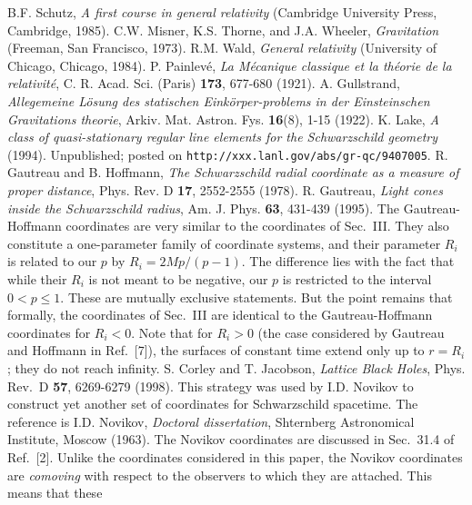 \begin{references}
   B.F. Schutz, {\it A first course in general
   relativity} (Cambridge University Press, Cambridge, 1985). 
   C.W. Misner, K.S. Thorne, and J.A. Wheeler, 
   {\it Gravitation} 
   (Freeman, San Francisco, 1973).
   R.M. Wald, {\it General relativity} 
   (University of Chicago, Chicago, 1984).  
   P. Painlev\'e, {\it La M\'ecanique classique et la th\'eorie de la 
   relativit\'e}, C. R. Acad. Sci. (Paris) {\bf 173}, 677-680 (1921). 
   A. Gullstrand, {\it Allegemeine L\"osung des statischen
   Eink\"orper-problems in der Einsteinschen Gravitations theorie}, 
   Arkiv. Mat. Astron. Fys. {\bf 16}(8), 1-15 (1922). 
   K. Lake, {\it A class of quasi-stationary regular line elements for
   the Schwarzschild geometry} (1994). Unpublished; posted on  
   {\tt http://xxx.lanl.gov/abs/gr-qc/9407005}.  
   R. Gautreau and B. Hoffmann, {\it The Schwarzschild radial
   coordinate as a measure of proper distance}, Phys. Rev. D {\bf 17},
   2552-2555 (1978).      
   R. Gautreau, {\it Light cones inside the Schwarzschild radius},
   Am. J. Phys. {\bf 63}, 431-439 (1995). 
   The Gautreau-Hoffmann coordinates are very similar to the
   coordinates of Sec.~III. They also constitute a one-parameter
   family of coordinate systems, and their parameter $R_i$ is related
   to our $p$ by $R_i = 2Mp/(p-1)$. The difference lies with the fact
   that while their $R_i$ is not meant to be negative, our $p$ is
   restricted to the interval $0 < p \leq 1$. These are mutually
   exclusive statements. But the point remains that formally, the
   coordinates of Sec.~III are identical to the Gautreau-Hoffmann
   coordinates for $R_i < 0$. Note that for $R_i > 0$ (the case
   considered by Gautreau and Hoffmann in Ref.~[7]), the surfaces of
   constant time extend only up to $r=R_i$; they do not reach
   infinity.    
   S. Corley and T. Jacobson, {\it Lattice Black Holes}, 
   Phys. Rev.~D {\bf 57}, 6269-6279 (1998). 
   This strategy was used by I.D. Novikov to construct yet another set 
   of coordinates for Schwarzschild spacetime. The reference is
   I.D. Novikov, {\it Doctoral dissertation}, Shternberg Astronomical
   Institute, Moscow (1963). The Novikov coordinates are discussed in 
   Sec.~31.4 of Ref.~[2]. Unlike the coordinates considered in this
   paper, the Novikov coordinates are {\it comoving} with respect to
   the observers to which they are attached. This means that these

\end{references}

